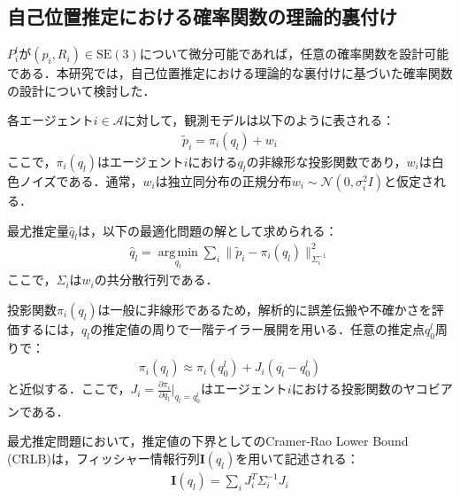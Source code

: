 \subsection{自己位置推定における確率関数の理論的裏付け}

$P^l_i$が$(p_i, R_i)\in \mathrm{SE(3)}$について微分可能であれば，任意の確率関数を設計可能である．本研究では，自己位置推定における理論的な裏付けに基づいた確率関数の設計について検討した．

各エージェント$i \in \mathcal{A}$に対して，観測モデルは以下のように表される：
\begin{equation}
\begin{aligned}
\tilde{p}_i = \pi_i(q_l) + w_i
\end{aligned}
\label{eq:observation_model}
\end{equation}
ここで，$\pi_i(q_l)$はエージェント$i$における$q_l$の非線形な投影関数であり，$w_i$は白色ノイズである．通常，$w_i$は独立同分布の正規分布$w_i \sim \mathcal{N}(0, \sigma_i^2 I)$と仮定される．

最尤推定量$\hat{q}_l$は，以下の最適化問題の解として求められる：
\begin{equation}
\begin{aligned}
\hat{q}_l = \operatorname*{arg\,min}_{q_l} \sum_i \| \tilde{p}_i - \pi_i(q_l) \|^2_{\Sigma_i^{-1}}
\end{aligned}
\label{eq:mle}
\end{equation}
ここで，$\Sigma_i$は$w_i$の共分散行列である．

投影関数$\pi_i(q_l)$は一般に非線形であるため，解析的に誤差伝搬や不確かさを評価するには，$q_l$の推定値の周りで一階テイラー展開を用いる．任意の推定点$q_0^l$周りで：
\begin{equation}
\begin{aligned}
\pi_i(q_l) \approx \pi_i(q_0^l) + J_i (q_l - q_0^l)
\end{aligned}
\label{eq:taylor_expansion}
\end{equation}
と近似する．ここで，$J_i = \frac{\partial \pi_i}{\partial q_l} \Big|_{q_l=q_0^l}$はエージェント$i$における投影関数のヤコビアンである．

最尤推定問題において，推定値の下界としてのCramer-Rao Lower Bound (CRLB)は，フィッシャー情報行列$\mathbf{I}(q_l)$を用いて記述される：
\begin{equation}
\begin{aligned}
\mathbf{I}(q_l) = \sum_i J_i^T \Sigma_i^{-1} J_i
\end{aligned}
\label{eq:fim}
\end{equation}

